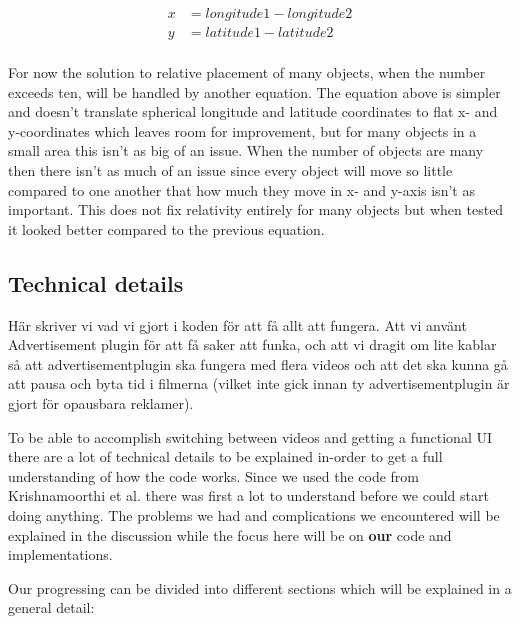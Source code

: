 \documentclass[9pt,a4paper]{acmproc}
\begin{document}

\begin{align*}
x &= longitude1-longitude2  \\
y &= latitude1-latitude2 \\
\end{align*}

For now the solution to relative placement of many objects, when the number exceeds ten, will be handled by another equation. The equation above is simpler and doesn't translate spherical longitude and latitude coordinates to flat x- and y-coordinates which leaves room for improvement, but for many objects in a small area this isn't as big of an issue. When the number of objects are many then there isn't as much of an issue since every object will move so little compared to one another that how much they move in x- and y-axis isn't as important. This does not fix relativity entirely for many objects but when tested it looked better compared to the previous equation. 

\subsection{Technical details}
Här skriver vi vad vi gjort i koden för att få allt att fungera. Att vi använt Advertisement plugin för att få saker att funka, och att vi dragit om lite kablar så att advertisementplugin ska fungera med flera videos och att det ska kunna gå att pausa och byta tid i filmerna (vilket inte gick innan ty advertisementplugin är gjort för opausbara reklamer).

To be able to accomplish switching between videos and getting a functional UI there are a lot of technical details to be explained in-order to get a full understanding of how the code works. Since we used the code from Krishnamoorthi et al.\cite{qualbranch} there was first a lot to understand before we could start doing anything. The problems we had and complications we encountered will be explained in the discussion while the focus here will be on \textbf{our} code and implementations. 

Our progressing can be divided into different sections which will be explained in a general detail:
\end{document}
